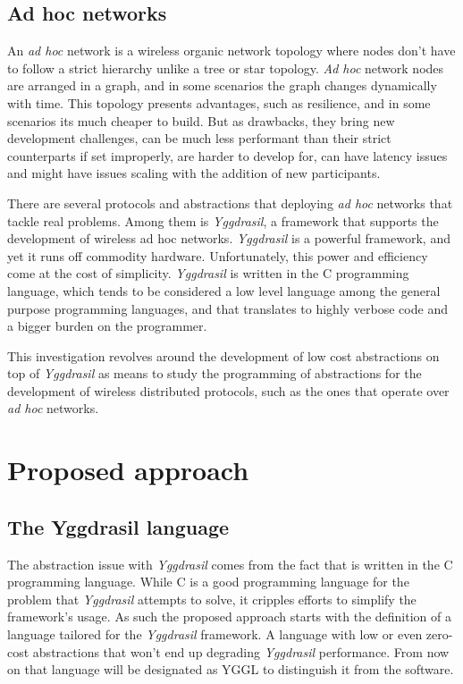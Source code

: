\documentclass[runningheads]{llncs}
\begin{document}
\subsection{Ad hoc networks}
An \textit{ad hoc} network is a wireless organic network topology where nodes don't have to follow a strict hierarchy unlike a tree or star topology. \textit{Ad hoc} network nodes are arranged in a graph, and in some scenarios the graph changes dynamically with time.\cite{Akos:2018}
This topology presents advantages, such as resilience, and in some scenarios its much cheaper to build. But as drawbacks, they bring new development challenges, can be much less performant than their strict counterparts if set improperly, are harder to develop for, can have latency issues and might have issues scaling with the addition of new participants.
\par There are several protocols and abstractions that deploying \textit{ad hoc} networks that tackle real problems. Among them is \textit{Yggdrasil}, a framework that supports the development of wireless ad hoc networks.
\textit{Yggdrasil} is a powerful framework, and yet it runs off commodity hardware. Unfortunately, this power and efficiency come at the cost of simplicity.
\textit{Yggdrasil} is written in the C programming language, which tends to be considered a low level language among the general purpose programming languages, and that translates to highly verbose code and a bigger burden on the programmer.
\par This investigation revolves around the development of low cost abstractions on top of \textit{Yggdrasil} as means to study the programming of abstractions for the development of wireless distributed protocols, such as the ones that operate over \textit{ad hoc} networks.

\section{Proposed approach}
\subsection{The Yggdrasil language}
The abstraction issue with \textit{Yggdrasil} comes from the fact that is written in the C programming language. While C is a good programming language for the problem that \textit{Yggdrasil} attempts to solve, it cripples efforts to simplify the framework's usage. As such the proposed approach starts with the definition of a language tailored for the \textit{Yggdrasil} framework. A language with low or even zero-cost abstractions that won't end up degrading \textit{Yggdrasil} performance. From now on that language will be designated as YGGL to distinguish it from the software.
\end{document}
